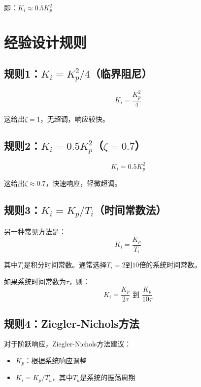\documentclass[12pt,a4paper]{article}
\begin{document}
即：$K_i \approx 0.5 K_p^2$

\section{经验设计规则}

\subsection{规则1：$K_i = K_p^2/4$（临界阻尼）}

\begin{equation}
K_i = \frac{K_p^2}{4}
\end{equation}

这给出$\zeta = 1$，无超调，响应较快。

\subsection{规则2：$K_i = 0.5 K_p^2$（$\zeta = 0.7$）}

\begin{equation}
K_i = 0.5 K_p^2
\end{equation}

这给出$\zeta \approx 0.7$，快速响应，轻微超调。

\subsection{规则3：$K_i = K_p/T_i$（时间常数法）}

另一种常见方法是：
\begin{equation}
K_i = \frac{K_p}{T_i}
\end{equation}

其中$T_i$是积分时间常数。通常选择$T_i = 2$到$10$倍的系统时间常数。

如果系统时间常数为$\tau$，则：
\begin{equation}
K_i = \frac{K_p}{2\tau} \text{ 到 } \frac{K_p}{10\tau}
\end{equation}

\subsection{规则4：Ziegler-Nichols方法}

对于阶跃响应，Ziegler-Nichols方法建议：
\begin{itemize}
\item $K_p$：根据系统响应调整
\item $K_i = K_p / T_u$，其中$T_u$是系统的振荡周期
\end{itemize}
\end{document}
